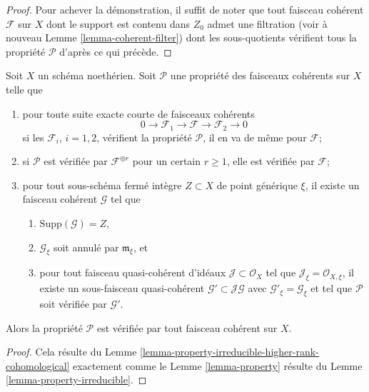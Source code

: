 \begin{proof}
\medskip\noindent
Pour achever la démonstration, il suffit de noter que tout faisceau cohérent
$\mathcal{F}$ sur $X$ dont le support est contenu dans $Z_0$ admet une filtration
(voir à nouveau Lemme \ref{lemma-coherent-filter}) dont les sous-quotients
vérifient tous la propriété $\mathcal{P}$ d'après ce qui précède.
\end{proof}

\begin{lemma}
\label{lemma-property-higher-rank-cohomological}
Soit $X$ un schéma noethérien.
Soit $\mathcal{P}$ une propriété des faisceaux cohérents sur $X$ telle que
\begin{enumerate}
\item pour toute suite exacte courte de faisceaux cohérents
$$
0 \to \mathcal{F}_1 \to \mathcal{F} \to \mathcal{F}_2 \to 0
$$
si les $\mathcal{F}_i$, $i = 1, 2$, vérifient la propriété $\mathcal{P}$,
il en va de même pour $\mathcal{F}$;
\item si $\mathcal{P}$ est vérifiée par $\mathcal{F}^{\oplus r}$ pour
un certain $r \geq 1$, elle est vérifiée par $\mathcal{F}$;
\item pour tout sous-schéma fermé intègre $Z \subset X$
de point générique $\xi$, il existe
un faisceau cohérent $\mathcal{G}$ tel que
\begin{enumerate}
\item $\text{Supp}(\mathcal{G}) = Z$,
\item $\mathcal{G}_\xi$ soit annulé par $\mathfrak m_\xi$, et
\item pour tout faisceau quasi-cohérent d'idéaux
$\mathcal{J} \subset \mathcal{O}_X$ tel que
$\mathcal{J}_\xi = \mathcal{O}_{X, \xi}$, il existe un sous-faisceau quasi-cohérent
$\mathcal{G}' \subset \mathcal{J}\mathcal{G}$ avec
$\mathcal{G}'_\xi = \mathcal{G}_\xi$ et tel que
$\mathcal{P}$ soit vérifiée par $\mathcal{G}'$.
\end{enumerate}
\end{enumerate}
Alors la propriété $\mathcal{P}$ est vérifiée par tout faisceau cohérent
sur $X$.
\end{lemma}

\begin{proof}
Cela résulte du Lemme \ref{lemma-property-irreducible-higher-rank-cohomological}
exactement comme le Lemme \ref{lemma-property} résulte du
Lemme \ref{lemma-property-irreducible}.
\end{proof}







